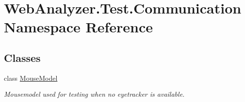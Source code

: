 \hypertarget{namespace_web_analyzer_1_1_test_1_1_communication}{}\section{Web\+Analyzer.\+Test.\+Communication Namespace Reference}
\label{namespace_web_analyzer_1_1_test_1_1_communication}
\subsection*{Classes}
\begin{DoxyCompactItemize}
\item 
class \hyperlink{class_web_analyzer_1_1_test_1_1_communication_1_1_mouse_model}{Mouse\+Model}
\begin{DoxyCompactList}\small\item\em Mousemodel used for testing when no eyetracker is available. \end{DoxyCompactList}\end{DoxyCompactItemize}
